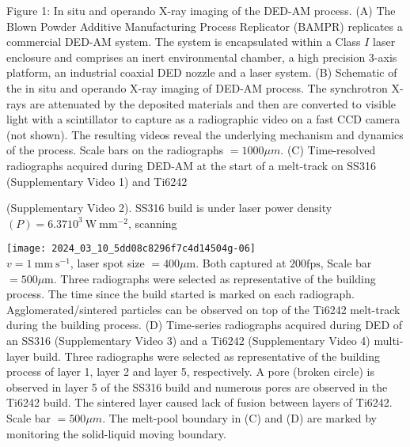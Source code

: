 \documentclass[10pt]{article}
\begin{document}
Figure 1: In situ and operando X-ray imaging of the DED-AM process. (A) The Blown Powder Additive Manufacturing Process Replicator (BAMPR) replicates a commercial DED-AM system. The system is encapsulated within a Class $I$ laser enclosure and comprises an inert environmental chamber, a high precision 3-axis platform, an industrial coaxial DED nozzle and a laser system. (B) Schematic of the in situ and operando X-ray imaging of DED-AM process. The synchrotron X-rays are attenuated by the deposited materials and then are converted to visible light with a scintillator to capture as a radiographic video on a fast CCD camera (not shown). The resulting videos reveal the underlying mechanism and dynamics of the process. Scale bars on the radiographs $=1000 \mu m$. (C) Time-resolved radiographs acquired during DED-AM at the start of a melt-track on SS316 (Supplementary Video 1) and Ti6242

(Supplementary Video 2). SS316 build is under laser power density $(P)=6.3710^{3} \mathrm{~W} \mathrm{~mm}^{-2}$, scanning

\texttt{[image: 2024\_03\_10\_5dd08c8296f7c4d14504g-06]}\\
$v=1 \mathrm{~mm} \mathrm{~s}{ }^{-1}$, laser spot size $=400 \mu \mathrm{m}$. Both captured at $200 \mathrm{fps}$, Scale bar $=500 \mu \mathrm{m}$. Three radiographs were selected as representative of the building process. The time since the build started is marked on each radiograph. Agglomerated/sintered particles can be observed on top of the Ti6242 melt-track during the building process. (D) Time-series radiographs acquired during DED of an SS316 (Supplementary Video 3) and a Ti6242 (Supplementary Video 4) multi-layer build. Three radiographs were selected as representative of the building process of layer 1, layer 2 and layer 5, respectively. A pore (broken circle) is observed in layer 5 of the SS316 build and numerous pores are observed in the Ti6242 build. The sintered layer caused lack of fusion between layers of Ti6242. Scale bar $=500 \mu m$. The melt-pool boundary in (C) and (D) are marked by monitoring the solid-liquid moving boundary.
\end{document}
